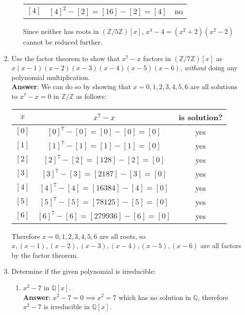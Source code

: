\documentclass{article}
\begin{document}
\begin{enumerate}
\begin{enumerate}
\begin{center}
\begin{tabular}{c|c|c}
                                    $[4]$ & $[4]^2-[2]=[16]-[2]=[4]$ & no
                              \end{tabular}
                        \end{center}
                        Since neither has roots in $(\mathbb{Z}/5\mathbb{Z})[x]$, $x^4-4=(x^2+2)(x^2-2)$ cannot be reduced further.
            \end{enumerate}
      \item Use the factor theorem to show that $x^7-x$ factors in $(\mathbb{Z}/7\mathbb{Z})[x]$ as $x(x-1)(x-2)(x-3)(x-4)(x-5)(x-6)$, \textit{without} doing any polynomial multiplication.\\
            \textbf{Answer}: We can do so by showing that $x=0,1,2,3,4,5,6$ are all solutions to $x^7-x=0$ in $\mathbb{Z}/\mathbb{Z}$ as follows:
            \begin{center}
                  \begin{tabular}{c|c|c}
                        $x$   & $x^7-x$                      & is solution? \\
                        \hline
                        $[0]$ & $[0]^7-[0]=[0]-[0]=[0]$      & yes          \\
                        $[1]$ & $[1]^7-[1]=[1]-[1]=[0]$      & yes          \\
                        $[2]$ & $[2]^7-[2]=[128]-[2]=[0]$    & yes          \\
                        $[3]$ & $[3]^7-[3]=[2187]-[3]=[0]$   & yes          \\
                        $[4]$ & $[4]^7-[4]=[16384]-[4]=[0]$  & yes          \\
                        $[5]$ & $[5]^7-[5]=[78125]-[5]=[0]$  & yes          \\
                        $[6]$ & $[6]^7-[6]=[279936]-[6]=[0]$ & yes
                  \end{tabular}
            \end{center}
            Therefore $x=0,1,2,3,4,5,6$ are all roots, so $x,(x-1),(x-2),(x-3),(x-4),(x-5),(x-6)$ are all factors by the factor theorem.
      \item Determine if the given polynomial is irreducible:
            \begin{enumerate}
                  \item $x^2-7$ in $\mathbb{Q}[x]$.\\
                        \textbf{Answer}: $x^2-7=0\implies x^2=7$ which has no solution in $\mathbb{Q}$, therefore $x^2-7$ is irreducible in $\mathbb{Q}[x]$.

\end{enumerate}
\end{enumerate}
\end{document}
